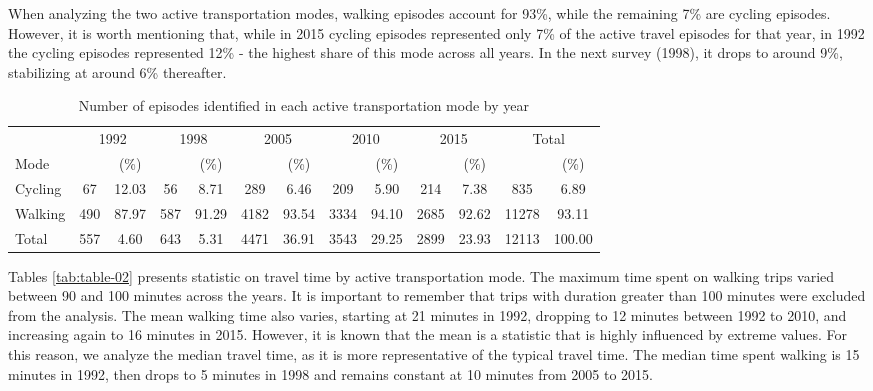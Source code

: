 \documentclass[preprint, 3p,
authoryear]{elsarticle} %
\begin{document}
When analyzing the two active transportation modes, walking episodes
account for 93\%, while the remaining 7\% are cycling episodes. However,
it is worth mentioning that, while in 2015 cycling episodes represented
only 7\% of the active travel episodes for that year, in 1992 the
cycling episodes represented 12\% - the highest share of this mode
across all years. In the next survey (1998), it drops to around 9\%,
stabilizing at around 6\% thereafter.

\begingroup\fontsize{10}{12}\selectfont

\begin{longtable}[t]{lcccccccccccc}
\caption{\label{tab:bulding table-01}\label{tab:episodes-count-percentages}Number of episodes identified in each active transportation mode by year}\\
\toprule
\multicolumn{1}{c}{ } & \multicolumn{2}{c}{1992} & \multicolumn{2}{c}{1998} & \multicolumn{2}{c}{2005} & \multicolumn{2}{c}{2010} & \multicolumn{2}{c}{2015} & \multicolumn{2}{c}{Total} \\
\cmidrule(l{3pt}r{3pt}){2-3} \cmidrule(l{3pt}r{3pt}){4-5} \cmidrule(l{3pt}r{3pt}){6-7} \cmidrule(l{3pt}r{3pt}){8-9} \cmidrule(l{3pt}r{3pt}){10-11} \cmidrule(l{3pt}r{3pt}){12-13}
Mode &  & (\%) &  & (\%) &  & (\%) &  & (\%) &  & (\%) &  & (\%)\\
\midrule
Cycling & 67 & 12.03 & 56 & 8.71 & 289 & 6.46 & 209 & 5.90 & 214 & 7.38 & 835 & 6.89\\
Walking & 490 & 87.97 & 587 & 91.29 & 4182 & 93.54 & 3334 & 94.10 & 2685 & 92.62 & 11278 & 93.11\\
Total & 557 & 4.60 & 643 & 5.31 & 4471 & 36.91 & 3543 & 29.25 & 2899 & 23.93 & 12113 & 100.00\\
\bottomrule
\end{longtable}
\endgroup{}

Tables \ref{tab:table-02} presents statistic on travel time by active
transportation mode. The maximum time spent on walking trips varied
between 90 and 100 minutes across the years. It is important to remember
that trips with duration greater than 100 minutes were excluded from the
analysis. The mean walking time also varies, starting at 21 minutes in
1992, dropping to 12 minutes between 1992 to 2010, and increasing again
to 16 minutes in 2015. However, it is known that the mean is a statistic
that is highly influenced by extreme values. For this reason, we analyze
the median travel time, as it is more representative of the typical
travel time. The median time spent walking is 15 minutes in 1992, then
drops to 5 minutes in 1998 and remains constant at 10 minutes from 2005
to 2015.
\end{document}
